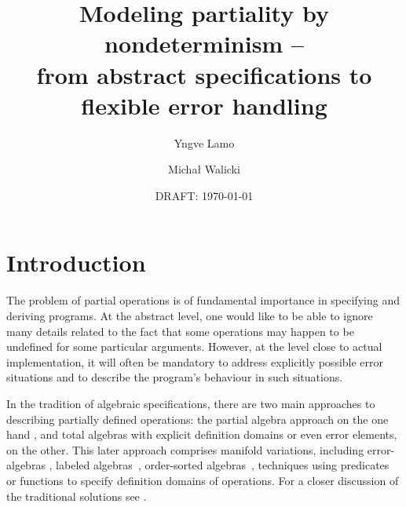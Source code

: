 \documentclass[10pt]{article}
\begin{document}
\title{Modeling partiality by nondeterminism --\\ from abstract
specifications to flexible error handling}
\author{Yngve Lamo \and Micha{\l} Walicki}
\date{DRAFT: \today}
\maketitle




\section{Introduction}
The problem of partial operations is of fundamental importance in specifying
and deriving programs. At the abstract level, one would like to be able to
ignore many details related to the fact that some operations may happen to be
undefined for some particular arguments. However, at the level close to
actual implementation, it will often be mandatory to address explicitly
possible error situations and to describe the program's behaviour in such
situations. 

In the tradition of algebraic specifications, there are two main
approaches to describing partially defined operations: the partial algebra approach
on the one hand \cite{burm,reichel,state}, and total algebras with explicit
definition domains or even error elements,
on the other. This later approach comprises manifold variations, including
error-algebras \cite{error}, labeled algebras~\cite{label}, 
order-sorted algebras~\cite{order1}, techniques using predicates \cite{member} or
functions \cite{guard} to specify definition domains of operations. For a closer
discussion of the traditional solutions see \cite{sort}.%
\end{document}
